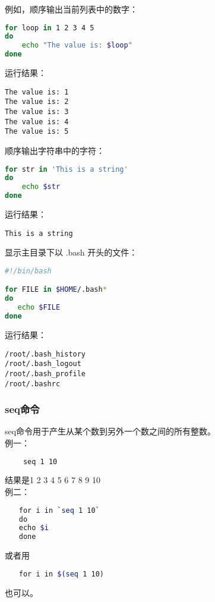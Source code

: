 例如，顺序输出当前列表中的数字：
\begin{lstlisting}[language=sh]
for loop in 1 2 3 4 5
do
    echo "The value is: $loop"
done
\end{lstlisting}
运行结果：
\begin{verbatim}
The value is: 1
The value is: 2
The value is: 3
The value is: 4
The value is: 5
\end{verbatim}

顺序输出字符串中的字符：
\begin{lstlisting}[language=sh]
for str in 'This is a string'
do
    echo $str
done
\end{lstlisting}
运行结果：
\begin{verbatim}
This is a string
\end{verbatim}

显示主目录下以 .bash 开头的文件：
\begin{lstlisting}[language=sh]
#!/bin/bash

for FILE in $HOME/.bash*
do
   echo $FILE
done
\end{lstlisting}
运行结果：
\begin{verbatim}
/root/.bash_history
/root/.bash_logout
/root/.bash_profile
/root/.bashrc
\end{verbatim}



\subsubsection{seq命令}
seq命令用于产生从某个数到另外一个数之间的所有整数。\\
例一：
\begin{lstlisting}[language=sh]
　　 seq 1 10
\end{lstlisting}
结果是1 2 3 4 5 6 7 8 9 10\\
例二：
\begin{lstlisting}[language=sh]
　　for i in `seq 1 10`
　　do
　　echo $i
　　done
\end{lstlisting}

或者用
\begin{lstlisting}[language=sh]
　　for i in $(seq 1 10)
\end{lstlisting}
也可以。


